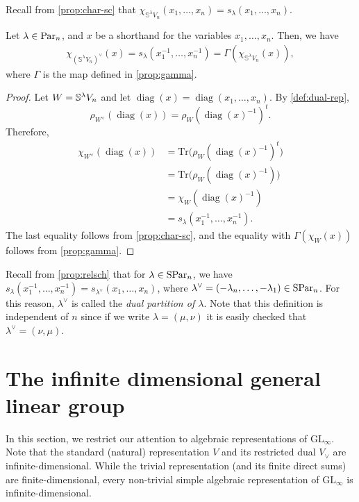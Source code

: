 \documentclass[11pt]{amsart}
\begin{document}
Recall from \cref{prop:char-sc} that $\chi_{\mathbb{S}^\lambda V_n}(x_1, \dots, x_n) = s_\lambda(x_1, \dots, x_n)$.
\begin{prop}\label{prop:char-dual}
    Let $\lambda \in \mathrm{Par}_n$, and $x$ be a shorthand for the variables $x_1, \dots, x_n$. Then, we have 
    \begin{align}
        \chi_{(\mathbb{S}^\lambda V_n)^\vee}(x) =s_\lambda(x_1^{-1}, \dots, x_n^{-1})=  \Gamma(\chi_{\mathbb{S}^\lambda V_n}(x)), \label{eq:cd2}
    \end{align}
    where $\Gamma$ is the map defined in \cref{prop:gamma}.
\end{prop}
\begin{proof}
Let $W=\mathbb{S}^\lambda V_n$ and let
$\operatorname{diag}(x) = \operatorname{diag}(x_1,\dots,x_n)$. By \cref{def:dual-rep},
\[
\rho_{W^\vee}(\operatorname{diag}(x))=\rho_W(\operatorname{diag}(x)^{-1})^t.
\]
Therefore,
\[
\begin{aligned}
\chi_{W^\vee}(\operatorname{diag}(x))
&=\mathrm{Tr}\bigl(\rho_W(\operatorname{diag}(x)^{-1})^t\bigr)\\
&=\mathrm{Tr}\bigl(\rho_W(\operatorname{diag}(x)^{-1})\bigr)\\
&=\chi_W(\operatorname{diag}(x)^{-1})\\
&=s_\lambda(x_1^{-1},\dots,x_n^{-1}).
\end{aligned}
\]
The last equality follows from \cref{prop:char-sc}, and the equality with
$\Gamma(\chi_W(x))$ follows from \cref{prop:gamma}.
\end{proof}


Recall from \cref{prop:relsch} that for $\lambda \in \mathrm{SPar}_n$, we have $s_\lambda(x_1^{-1}, \dots, x_n^{-1}) = s_{\lambda^{\vee}}(x_1,\dots,x_n)$, where $\lambda^\vee= ( - \lambda_n, \dots, -\lambda_1) \in \mathrm{SPar}_n$. For this reason, $\lambda^{\vee}$ is called the \emph{dual partition of $\lambda$}. Note that this definition is independent of \(n\) since if we write \(\lambda = (\mu,\nu)\) it is easily checked that \(\lambda^\vee = (\nu,\mu)\).


\section{The infinite dimensional general linear group} \label{sec:repGLinf}
In this section, we restrict our attention to algebraic representations of $\mathrm{GL}_\infty$. Note that the standard (natural) representation $V$ and its restricted dual $V_\vee$ are infinite-dimensional. While the trivial representation (and its finite direct sums) are finite-dimensional, every non-trivial simple algebraic representation of $\mathrm{GL}_\infty$ is infinite-dimensional.
\end{document}

